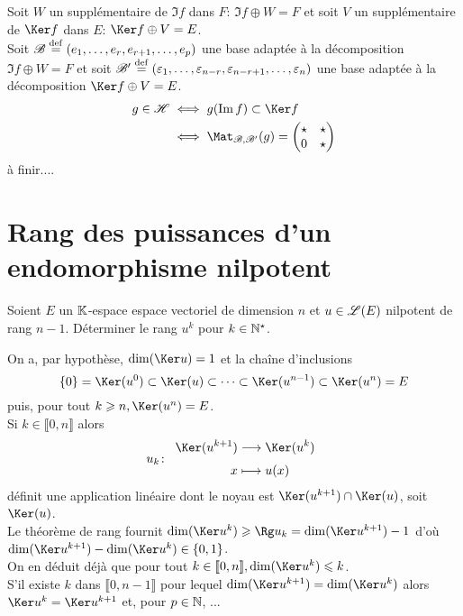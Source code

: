 \begin{solution}
    Soit $W$ un supplémentaire de $\Im f$ dans $F$: $\Im f \oplus W = F$ et soit $V$ un supplémentaire de $\Ker f$ dans $E$: $\Ker f \oplus V = E$. \\
    Soit $\mathscr{B} \overset{\mathrm{\tiny def}}{=} (e_1, \dots, e_r, e_{r+1}, \dots, e_p)$ une base adaptée à la décomposition $\Im f \oplus W = F$ et soit $\mathscr{B}' \overset{\mathrm{\tiny def}}{=} (\varepsilon_1, \dots, \varepsilon_{n-r}, \varepsilon_{n-r+1}, \dots, \varepsilon_n)$ une base adaptée à la décomposition $\Ker f \oplus V = E$.
    \begin{align*}
        g \in \mathscr{H} &\iff g(\Im f) \subset \Ker f \\
        &\iff \Mat_{\mathscr{B}, \mathscr{B}'}(g) = 
        \begin{pmatrix}
            \star & \star \\
            0 & \star
        \end{pmatrix}
    \end{align*}
    à finir....
\end{solution}

\section{Rang des puissances d'un endomorphisme nilpotent} 
\begin{exercice}
    Soient $E$ un $\mathbb{K}$-espace espace vectoriel de dimension $n$ et $u \in \mathscr{L}(E)$ nilpotent de rang $n-1$. Déterminer le rang $u^k$ pour $k \in \mathbb{N}^\star$. 
\end{exercice}

\begin{solution}
    On a, par hypothèse, $\dim(\Ker u) = 1$ et la chaîne d'inclusions
    $$\{0\} = \Ker(u^0) \subset \Ker(u) \subset \cdots \subset \Ker(u^{n-1}) \subset \Ker(u^n) = E$$
    puis, pour tout $k \geqslant n, \Ker(u^n) = E$. \\
    Si $k \in \llbracket 0, n \rrbracket$ alors 
    $$
        \fonction[u_k]{\Ker(u^{k+1})}{\Ker(u^k)}{x}{u(x)}
    $$
    définit une application linéaire dont le noyau est $\Ker(u^{k+1}) \cap \Ker(u)$, soit $\Ker(u)$. \\
    Le théorème de rang fournit $\dim(\Ker u^k) \geqslant \Rg u_k = \dim( \Ker u^{k+1}) - 1$ d'où $\dim(\Ker u^{k+1}) - \dim(\Ker u^k) \in \{ 0, 1 \}$. \\
    On en déduit déjà que pour tout $k \in \llbracket 0, n \rrbracket, \dim(\Ker u^k) \leqslant k$. \\
    S'il existe $k$ dans $\llbracket 0, n-1 \rrbracket$ pour lequel $\dim( \Ker u^{k+1}) = \dim(\Ker u^k)$ alors $\Ker u^k = \Ker u^{k+1}$ et, pour $p \in \mathbb{N}$, 
    ...
\end{solution}

